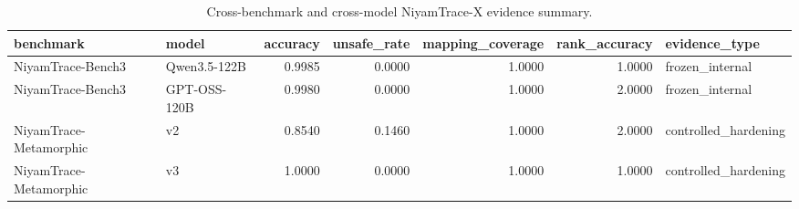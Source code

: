 \begin{table}
\caption{Cross-benchmark and cross-model NiyamTrace-X evidence summary.}
\label{tab:multibench}
\begin{tabular}{llrrrrl}
\toprule
benchmark & model & accuracy & unsafe_rate & mapping_coverage & rank_accuracy & evidence_type \\
\midrule
NiyamTrace-Bench3 & Qwen3.5-122B & 0.9985 & 0.0000 & 1.0000 & 1.0000 & frozen_internal \\
NiyamTrace-Bench3 & GPT-OSS-120B & 0.9980 & 0.0000 & 1.0000 & 2.0000 & frozen_internal \\
NiyamTrace-Metamorphic & v2 & 0.8540 & 0.1460 & 1.0000 & 2.0000 & controlled_hardening \\
NiyamTrace-Metamorphic & v3 & 1.0000 & 0.0000 & 1.0000 & 1.0000 & controlled_hardening \\
\bottomrule
\end{tabular}
\end{table}
